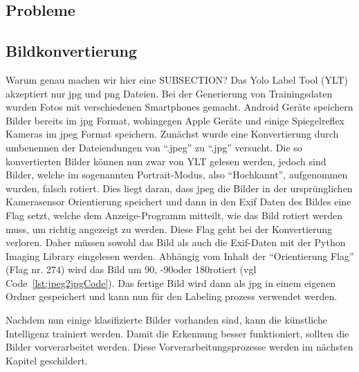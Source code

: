 \documentclass[a4paper,oneside,12pt]{report}
\begin{document}
\begin{onehalfspace}
		\section{Probleme}
			\subsection{Bildkonvertierung}
				Warum genau machen wir hier eine SUBSECTION?
				Das Yolo Label Tool (YLT) akzeptiert nur jpg und png Dateien. Bei der Generierung von Trainingsdaten wurden Fotos mit verschiedenen Smartphones gemacht. Android Geräte speichern Bilder bereits im jpg Format, wohingegen Apple Geräte und einige Spiegelreflex Kameras im jpeg Format speichern. Zunächst wurde eine Konvertierung durch umbenennen der Dateiendungen von "`.jpeg"' zu "`.jpg"' versucht. Die so konvertierten Bilder können nun zwar von YLT gelesen werden, jedoch sind Bilder, welche im sogenannten Portrait-Modus, also "`Hochkannt"', aufgenommen wurden, falsch rotiert. Dies liegt daran, dass jpeg die Bilder in der ursprünglichen Kamerasensor Orientierung speichert und dann in den Exif Daten des Bildes eine Flag setzt, welche dem Anzeige-Programm mitteilt, wie das Bild rotiert werden muss, um richtig angezeigt zu werden. Diese Flag geht bei der Konvertierung verloren. Daher müssen sowohl das Bild als auch die Exif-Daten mit der Python Imaging Library eingelesen werden. Abhängig vom Inhalt der "`Orientierung Flag"' (Flag nr. 274) wird das Bild um 90\degree, -90\degree oder 180\degree rotiert (vgl Code~\ref{lst:jpeg2jpgCode}). Das fertige Bild wird dann als jpg in einem eigenen Ordner gespeichert und kann nun für den Labeling prozess verwendet werden.
				
				Nachdem nun einige klasifizierte Bilder vorhanden sind, kann die künstliche Intelligenz trainiert werden. Damit die Erkennung besser funktioniert, sollten die Bilder vorverarbeitet werden. Diese Vorverarbeitungsprozesse werden im nächsten Kapitel geschildert.
			
	\end{onehalfspace}
\end{document}
